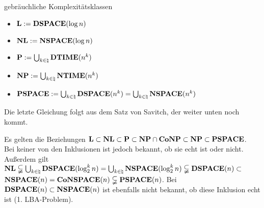 \linie

\begin{Def}{gebräuchliche Komplexitätsklassen}
    \begin{itemize}
        \item
        $\mathbf{L} := \mathbf{DSPACE}(\log n)$

        \item
        $\mathbf{NL} := \mathbf{NSPACE}(\log n)$

        \item
        $\mathbf{P} := \bigcup_{k \in \natural} \mathbf{DTIME}(n^k)$

        \item
        $\mathbf{NP} := \bigcup_{k \in \natural} \mathbf{NTIME}(n^k)$

        \item
        $\mathbf{PSPACE} := \bigcup_{k \in \natural} \mathbf{DSPACE}(n^k) =
        \bigcup_{k \in \natural} \mathbf{NSPACE}(n^k)$
    \end{itemize}
\end{Def}

\begin{Bem}
    Die letzte Gleichung folgt aus dem Satz von Savitch, der weiter unten noch kommt.
\end{Bem}

\linie
\pagebreak

\begin{Bem}
    Es gelten die Beziehungen
    $\mathbf{L} \subset \mathbf{NL} \subset \mathbf{P} \subset \mathbf{NP} \cap \mathbf{Co}\mathbf{NP} \subset
    \mathbf{NP} \subset \mathbf{PSPACE}$.\\
    Bei keiner von den Inklusionen ist jedoch bekannt, ob sie echt ist oder nicht.\\
    Außerdem gilt $\mathbf{NL} \subsetneqq \bigcup_{k \in \natural} \mathbf{DSPACE}(\log_2^k n) =
    \bigcup_{k \in \natural} \mathbf{NSPACE}(\log_2^k n) \subsetneqq \mathbf{DSPACE}(n) \subset$\\
    $\mathbf{NSPACE}(n) = \mathbf{Co}\mathbf{NSPACE}(n) \subsetneqq \mathbf{PSPACE}(n)$.
    Bei $\mathbf{DSPACE}(n) \subset \mathbf{NSPACE}(n)$ ist ebenfalls nicht bekannt, ob diese Inklusion echt ist
    (1. LBA-Problem).
\end{Bem}

